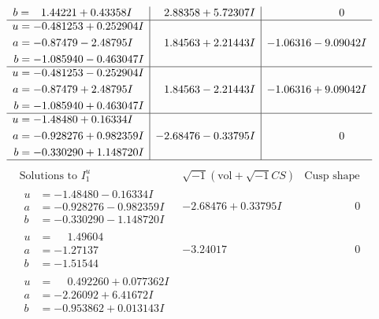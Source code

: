 \documentclass[1p]{elsarticle_modified}
\theoremstyle{definition}
\newcommand{\I}{\sqrt{-1}}
\begin{document}
$$\begin{array}{c|c|c}
\begin{aligned}
b &= \phantom{-}1.44221 + 0.43358 I\end{aligned}
 & \phantom{-}2.88358 + 5.72307 I & \phantom{-0.000000 } 0 \\ \hline\begin{aligned}
u &= -0.481253 + 0.252904 I \\
a &= -0.87479 - 2.48795 I \\
b &= -1.085940 - 0.463047 I\end{aligned}
 & \phantom{-}1.84563 + 2.21443 I & -1.06316 - 9.09042 I \\ \hline\begin{aligned}
u &= -0.481253 - 0.252904 I \\
a &= -0.87479 + 2.48795 I \\
b &= -1.085940 + 0.463047 I\end{aligned}
 & \phantom{-}1.84563 - 2.21443 I & -1.06316 + 9.09042 I \\ \hline\begin{aligned}
u &= -1.48480 + 0.16334 I \\
a &= -0.928276 + 0.982359 I \\
b &= -0.330290 + 1.148720 I\end{aligned}
 & -2.68476 - 0.33795 I & \phantom{-0.000000 } 0\\
 \hline 
 \end{array}$$\newpage$$\begin{array}{c|c|c}  
\text{Solutions to }I^u_{1}& \I (\text{vol} + \sqrt{-1}CS) & \text{Cusp shape}\\
 \hline 
\begin{aligned}
u &= -1.48480 - 0.16334 I \\
a &= -0.928276 - 0.982359 I \\
b &= -0.330290 - 1.148720 I\end{aligned}
 & -2.68476 + 0.33795 I & \phantom{-0.000000 } 0 \\ \hline\begin{aligned}
u &= \phantom{-}1.49604\phantom{ +0.000000I} \\
a &= -1.27137\phantom{ +0.000000I} \\
b &= -1.51544\phantom{ +0.000000I}\end{aligned}
 & -3.24017\phantom{ +0.000000I} & \phantom{-0.000000 } 0 \\ \hline\begin{aligned}
u &= \phantom{-}0.492260 + 0.077362 I \\
a &= -2.26092 + 6.41672 I \\
b &= -0.953862 + 0.013143 I\end{aligned}

\end{array}$$
\end{document}
